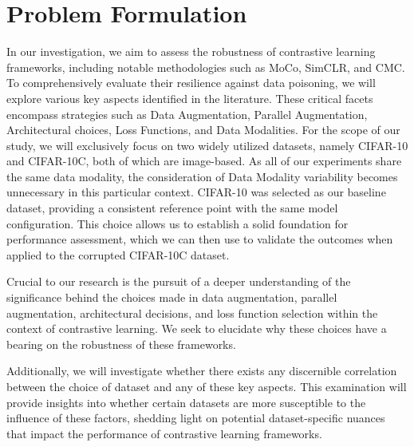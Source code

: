 \section{Problem Formulation}

\iffalse
\begin{enumerate}
    \item Clearly define the problem or question your research aims to address.
    \item Try to be formal here (use mathematical notation as far as possible)
    \item Clearly state the specific setting you are exploring rather than the overarching problem
\end{enumerate}
\fi

In our investigation, we aim to assess the robustness of contrastive learning frameworks, including notable methodologies such as MoCo, SimCLR, and CMC. To comprehensively evaluate their resilience against data poisoning, we will explore various key aspects identified in the literature. These critical facets encompass strategies such as Data Augmentation, Parallel Augmentation, Architectural choices, Loss Functions, and Data Modalities. For the scope of our study, we will exclusively focus on two widely utilized datasets, namely CIFAR-10 and CIFAR-10C, both of which are image-based. As all of our experiments share the same data modality, the consideration of Data Modality variability becomes unnecessary in this particular context. CIFAR-10 was selected as our baseline dataset, providing a consistent reference point with the same model configuration. This choice allows us to establish a solid foundation for performance assessment, which we can then use to validate the outcomes when applied to the corrupted CIFAR-10C dataset.

Crucial to our research is the pursuit of a deeper understanding of the significance behind the choices made in data augmentation, parallel augmentation, architectural decisions, and loss function selection within the context of contrastive learning. We seek to elucidate why these choices have a bearing on the robustness of these frameworks.

Additionally, we will investigate whether there exists any discernible correlation between the choice of dataset and any of these key aspects. This examination will provide insights into whether certain datasets are more susceptible to the influence of these factors, shedding light on potential dataset-specific nuances that impact the performance of contrastive learning frameworks.

